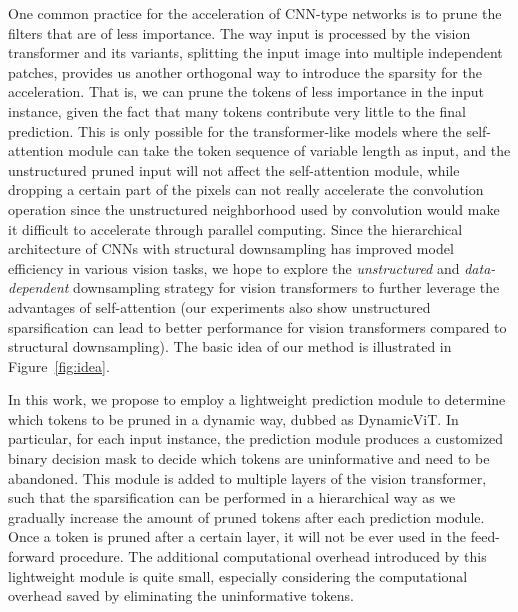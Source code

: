 \documentclass{article}
\begin{document}
One common practice for the acceleration of CNN-type networks is to prune the filters that are of less importance. The way input is processed by the vision transformer and its variants, \ie splitting the input image into multiple independent patches, provides us another orthogonal way to introduce the sparsity for the acceleration. That is, we can prune the tokens of less importance in the input instance, given the fact that many tokens contribute very little to the final prediction.  This is only possible for the transformer-like models where the self-attention module can take the token sequence of variable length as input, and the unstructured pruned input will not affect the self-attention module, while dropping a certain part of the pixels can not really accelerate the convolution operation since the unstructured neighborhood used by convolution would make it difficult to accelerate through parallel computing. Since the hierarchical architecture of CNNs with structural downsampling has improved model efficiency in various vision tasks, we hope to explore the \emph{unstructured} and \emph{data-dependent} downsampling strategy for vision transformers to further leverage the advantages of self-attention (our experiments also show unstructured sparsification can lead to better performance for vision transformers compared to structural downsampling). The basic idea of our method is illustrated in Figure~\ref{fig:idea}.

In this work, we propose to employ a lightweight prediction module to determine which tokens to be pruned in a dynamic way, dubbed as DynamicViT. In particular, for each input instance, the prediction module produces a customized binary decision mask to decide which tokens are uninformative and need to be abandoned. This module is added to multiple layers of the vision transformer, such that the sparsification can be performed in a hierarchical way as we gradually increase the amount of pruned tokens after each prediction module. Once a token is pruned after a certain layer, it will not be ever used in the feed-forward procedure. The additional computational overhead introduced by this lightweight module is quite small, especially considering the computational overhead saved by eliminating the uninformative tokens.
\end{document}
